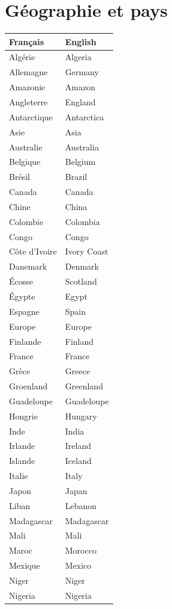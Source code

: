 \documentclass[12pt,a4paper]{article}
\begin{document}
\section{Géographie et pays}
\begin{longtable}{p{4cm} p{6cm}}
\toprule
\textbf{Français} & \textbf{English} \\
\midrule
Algérie & Algeria \\
Allemagne & Germany \\
Amazonie & Amazon \\
Angleterre & England \\
Antarctique & Antarctica \\
Asie & Asia \\
Australie & Australia \\
Belgique & Belgium \\
Brésil & Brazil \\
Canada & Canada \\
Chine & China \\
Colombie & Colombia \\
Congo & Congo \\
Côte d'Ivoire & Ivory Coast \\
Danemark & Denmark \\
Écosse & Scotland \\
Égypte & Egypt \\
Espagne & Spain \\
Europe & Europe \\
Finlande & Finland \\
France & France \\
Grèce & Greece \\
Groenland & Greenland \\
Guadeloupe & Guadeloupe \\
Hongrie & Hungary \\
Inde & India \\
Irlande & Ireland \\
Islande & Iceland \\
Italie & Italy \\
Japon & Japan \\
Liban & Lebanon \\
Madagascar & Madagascar \\
Mali & Mali \\
Maroc & Morocco \\
Mexique & Mexico \\
Niger & Niger \\
Nigeria & Nigeria \\

\end{longtable}
\end{document}
